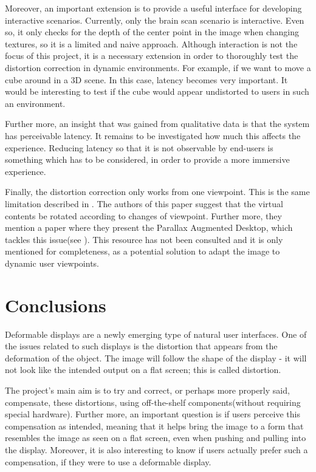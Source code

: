 \documentclass[]{article}
\begin{document}
Moreover, an important extension is to provide a useful interface for developing interactive scenarios. Currently, only the brain scan scenario is interactive. Even so, it only checks for the depth of the center point in the image when changing textures, so it is a limited and naive approach. Although interaction is not the focus of this project, it is a necessary extension in order to thoroughly test the distortion correction in dynamic environments. For example, if we want to move a cube around in a 3D scene. In this case, latency becomes very important. It would be interesting to test if the cube would appear undistorted to users in such an environment. 

Further more, an insight that was gained from qualitative data is that the system has perceivable latency. It remains to be investigated how much this affects the experience. Reducing latency so that it is not observable by end-users is something which has to be considered, in order to provide a more immersive experience.

Finally, the distortion correction only works from one viewpoint. This is the same limitation described in \cite{watanabe08}. The authors of this paper suggest that the virtual contents be rotated according to changes of viewpoint. Further more, they mention a paper where they present the Parallax Augmented Desktop, which tackles this issue(see \cite{reynolds08}). This resource has not been consulted and it is only mentioned for completeness, as a potential solution to  adapt the image to dynamic user viewpoints.

\clearpage
\section{Conclusions}

Deformable displays are a newly emerging type of natural user interfaces. One of the issues related to such displays is the distortion that appears from the deformation of the object. The image will follow the shape of the display - it will not look like the intended output on a flat screen; this is called distortion. 

The project's main aim is to try and correct, or perhaps more properly said, compensate, these distortions, using off-the-shelf components(without requiring special hardware). Further more, an important question is if users perceive this compensation as intended, meaning that it helps bring the image to a form that resembles the image as seen on a flat screen, even when pushing and pulling into the display. Moreover, it is also interesting to know if users actually prefer such a compensation, if they were to use a deformable display.
\end{document}
